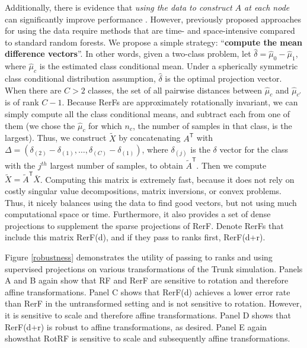 \documentclass{article}
\providecommand{\mt}[1]{\widetilde{#1}}
\providecommand{\mh}[1]{\hat{#1}}
\newcommand{\T}{^{\ensuremath{\mathsf{T}}}}           %
\begin{document}
Additionally, there is evidence that {\em{using the data to construct $A$ at each node}} can significantly improve performance \cite{Heath1993}. However, previously proposed approaches for using the data require methods that are time- and space-intensive compared to standard random forests.  We propose a simple strategy: ``{\bf{compute the mean difference vectors}}''. In other words, given a two-class problem, let $\mh{\delta}=\mh{\mu}_0-\mh{\mu}_1$, where $\mh{\mu}_c$ is the estimated class conditional mean. Under a spherically symmetric class conditional distribution assumption, $\mh{\delta}$ is the optimal projection vector. When there are $C>2$ classes, the set of all pairwise distances between $\mh{\mu}_c$ and $\mh{\mu}_{c'}$ is of rank $C-1$. Because RerFs are approximately rotationally invariant, we can simply compute all the class conditional means, and subtract each from one of them (we chose the $\mh{\mu}_c$ for which $n_c$, the number of samples in that class, is the largest). Thus, we construct $\mt{X}$ by concatenating $A\T$ with $\Delta=(\delta_{(2)} - \delta_{(1)}, \ldots, \delta_{(C)} - \delta_{(1)})$, where $\delta_{(j)}$ is the $\delta$ vector for the class with the $j^{th}$ largest number of samples, to obtain $\mt{A}\T$. Then we compute $\mt{X} = \mt{A}\T\bar{X}$. Computing this matrix is extremely fast, because it does not rely on costly singular value decompositions, matrix inversions, or convex problems. Thus, it nicely balances using the data to find good vectors, but not using much computational space or time. Furthermore, it also provides a set of dense projections to supplement the sparse projections of RerF. Denote RerFs that include this matrix RerF(d), and if they pass to ranks first, RerF(d+r). 


Figure \ref{robustness} demonstrates the utility of passing to ranks and using supervised projections on various transformations of the Trunk simulation. Panels A and B again show that RF and RerF are sensitive to rotation and therefore affine transformations. Panel C shows that RerF(d) achieves a lower error rate than RerF in the untransformed setting and is not sensitive to rotation. However, it is sensitive to scale and therefore affine transformations. Panel D shows that RerF(d+r) is robust to affine transformations, as desired. Panel E again showsthat RotRF is sensitive to scale and subsequently affine transformations.
\end{document}
